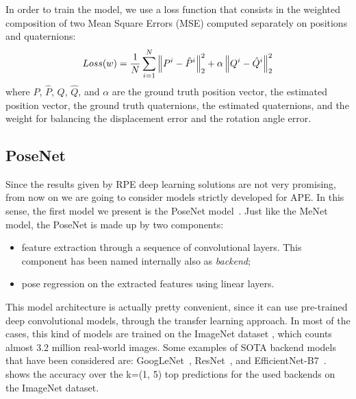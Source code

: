 In order to train the model, we use a loss function that consists in the weighted composition of two Mean Square Errors (MSE) computed separately on positions and quaternions:
\begin{equation}
    Loss(w) = \frac{1}{N} \sum\limits_{i=1}^N \norm{P^i - \hat{P}^i}^2_2 + \alpha\norm{Q^i - \hat{Q}^i}^2_2
    \label{eq:menet-loss}
\end{equation}
where $P$, $\hat{P}$, $Q$, $\hat{Q}$, and $\alpha$ are the ground truth position vector, the estimated position vector, the ground truth quaternions, the estimated quaternions, and the weight for balancing the displacement error and the rotation angle error.

\subsection{PoseNet}
Since the results given by RPE deep learning solutions are not very promising, from now on we are going to consider models strictly developed for APE.
In this sense, the first model we present is the PoseNet model~\cite{9348762}.
Just like the MeNet model, the PoseNet is made up by two components:
\begin{itemize}
    \item feature extraction through a sequence of convolutional layers. This component has been named internally also as \emph{backend};
    \item pose regression on the extracted features using linear layers.
\end{itemize}
This model architecture is actually pretty convenient, since it can use pre-trained deep convolutional models, through the transfer learning approach. In most of the cases, this kind of models are trained on the ImageNet dataset \cite{imagenet}, which counts almost 3.2 million real-world images. Some examples of SOTA backend models that have been considered are: GoogLeNet~\cite{googlenet}, ResNet~\cite{resnet}, and EfficientNet-B7~\cite{efficientnet}.  shows the accuracy over the k=(1, 5) top predictions for the used backends on the ImageNet dataset.

